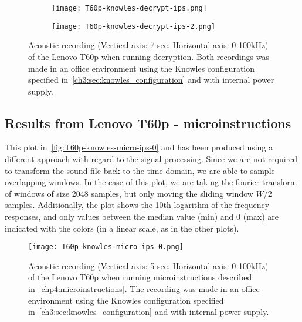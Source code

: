 \begin{figure}[ht]
    \begin{subfigure}{0.8\textwidth}
        \centering
        \texttt{[image: T60p-knowles-decrypt-ips.png]}
        \caption{}
        \label{fig:T60p-knowles-decrypt-ips}
    \end{subfigure}
    \begin{subfigure}{0.8\textwidth}
        \centering
        \texttt{[image: T60p-knowles-decrypt-ips-2.png]}
        \caption{}
        \label{fig:T60p-knowles-decrypt-ips-2}
    \end{subfigure}
    \caption{Acoustic recording (Vertical axis: 7 sec. Horizontal axis: 0-100kHz) of the Lenovo T60p when running decryption.
    Both recordings was made in an office environment using the Knowles configuration specified in~\autoref{ch3:sec:knowles_configuration} and with internal power supply. }
    \label{fig:T60p-knowles-decrypt-ips}
\end{figure}

\subsection{Results from Lenovo T60p - microinstructions}\label{subsec:t60p_knowles_results_micro}
This plot in~\autoref{fig:T60p-knowles-micro-ips-0} and has been produced using a different approach with regard to the signal processing. 
Since we are not required to transform the sound file back to the time domain, we are able to sample overlapping windows.
In the case of this plot, we are taking the fourier transform of windows of size 2048 samples, but only moving the sliding window \({W/2}\) samples.
Additionally, the plot shows the 10th logarithm of the frequency responses, and only values between the median value (min) and 0 (max) are indicated with the colors (in a linear scale, as in the other plots). 
\begin{figure}[ht]
    \centering
    \texttt{[image: T60p-knowles-micro-ips-0.png]}
    \caption{Acoustic recording (Vertical axis: 5 sec. Horizontal axis: 0-100kHz) of the Lenovo T60p when running microinstructions described in~\autoref{chp4:microinstructions}. The recording was made in an office environment using the Knowles configuration specified in~\autoref{ch3:sec:knowles_configuration} and with internal power supply. }
    \label{fig:T60p-knowles-micro-ips-0}
\end{figure}
